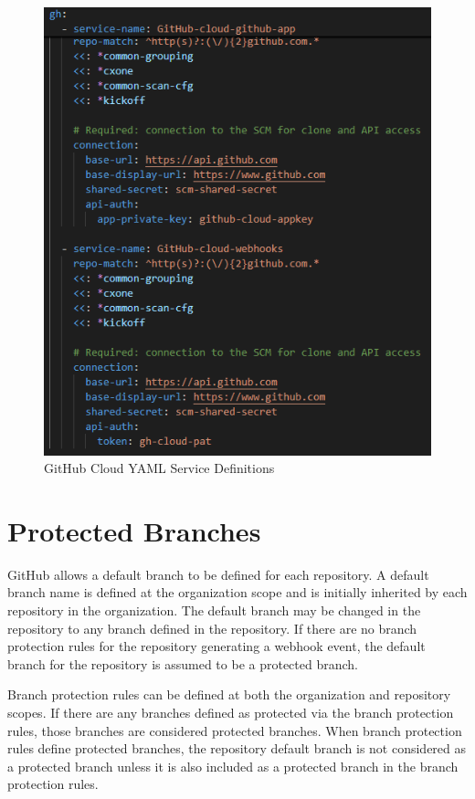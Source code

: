 \begin{figure}[h]
    \includegraphics[width=\textwidth]{graphics/gh-cloud-yaml.png}
    \caption{GitHub Cloud YAML Service Definitions}
    \label{fig:gh-cloud-yaml}
\end{figure}


\section{Protected Branches}

GitHub allows a default branch to be defined for each repository.  A default branch name is defined at the organization
scope and is initially inherited by each repository in the organization.  The default branch may be changed in the repository
to any branch defined in the repository. If there are no branch protection rules for the repository generating a webhook event, 
the default branch for the repository is assumed to be a protected branch.

Branch protection rules can be defined at both the organization and repository scopes.  If there are any branches
defined as protected via the branch protection rules, those branches are considered protected branches.  When branch protection
rules define protected branches, the repository default branch is not considered as a protected branch unless it is also included
as a protected branch in the branch protection rules.
